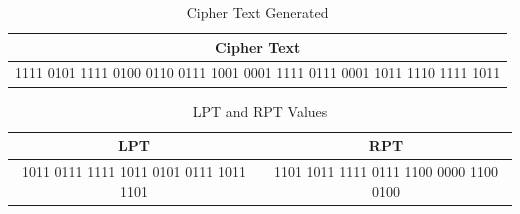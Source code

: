 \documentclass[12pt, letterpaper]{article}
\begin{document}
\begin{table}[h]
    \centering
    \begin{tabular}{|c|}
        \hline
          Cipher Text \\
        \hline
           1111 0101 1111 0100 0110 0111 1001 0001 1111 0111 0001 1011 1110 1111 1011
  \\
        \hline
    \end{tabular}
    \caption{Cipher Text Generated}
    \label{tab:text-key}
\end{table}

\begin{table}[h]
    \centering
    \begin{tabular}{|c|c|}
        \hline
        LPT & RPT \\
        \hline
         1011 0111 1111 1011 0101 0111 1011 1101 & 1101 1011 1111 0111 1100 0000 1100 0100  \\
        \hline
    \end{tabular}
    \caption{LPT and RPT Values}
    \label{tab:lpt-rpt}
\end{table}
\end{document}
